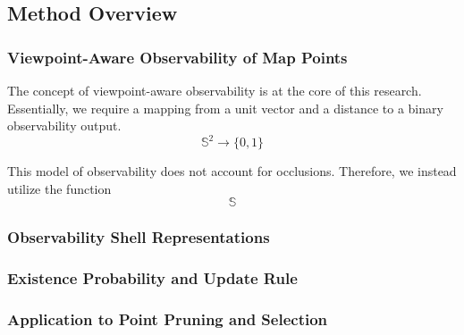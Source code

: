 \subsection{Method Overview}

\subsubsection{Viewpoint-Aware Observability of Map Points}


The concept of viewpoint-aware observability is at the core of this research. Essentially, we require a mapping from a unit vector and a distance to a binary observability output.
$$
    \mathbb{S}^2\rightarrow\{0,1\}
$$


This model of observability does not account for occlusions. Therefore, we instead utilize the function
$$
    \mathbb{S}
$$



\subsubsection{Observability Shell Representations}

\subsubsection{Existence Probability and Update Rule}

\subsubsection{Application to Point Pruning and Selection}
